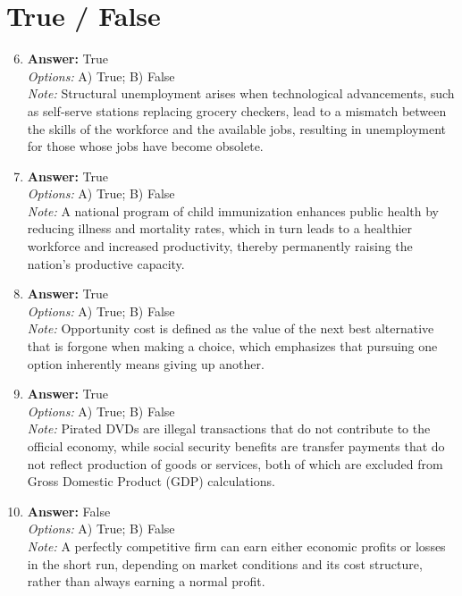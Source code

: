 \documentclass[12pt]{article}
\begin{document}
\section*{True / False}
\begin{enumerate}[label=\arabic*.]
\setcounter{enumi}{5}
\item \textbf{Answer:} True
\\ \textit{Options:} A) True; B) False
\\ \textit{Note:} Structural unemployment arises when technological advancements, such as self-serve stations replacing grocery checkers, lead to a mismatch between the skills of the workforce and the available jobs, resulting in unemployment for those whose jobs have become obsolete.
\item \textbf{Answer:} True
\\ \textit{Options:} A) True; B) False
\\ \textit{Note:} A national program of child immunization enhances public health by reducing illness and mortality rates, which in turn leads to a healthier workforce and increased productivity, thereby permanently raising the nation's productive capacity.
\item \textbf{Answer:} True
\\ \textit{Options:} A) True; B) False
\\ \textit{Note:} Opportunity cost is defined as the value of the next best alternative that is forgone when making a choice, which emphasizes that pursuing one option inherently means giving up another.
\item \textbf{Answer:} True
\\ \textit{Options:} A) True; B) False
\\ \textit{Note:} Pirated DVDs are illegal transactions that do not contribute to the official economy, while social security benefits are transfer payments that do not reflect production of goods or services, both of which are excluded from Gross Domestic Product (GDP) calculations.
\item \textbf{Answer:} False
\\ \textit{Options:} A) True; B) False
\\ \textit{Note:} A perfectly competitive firm can earn either economic profits or losses in the short run, depending on market conditions and its cost structure, rather than always earning a normal profit.
\end{enumerate}
\end{document}
